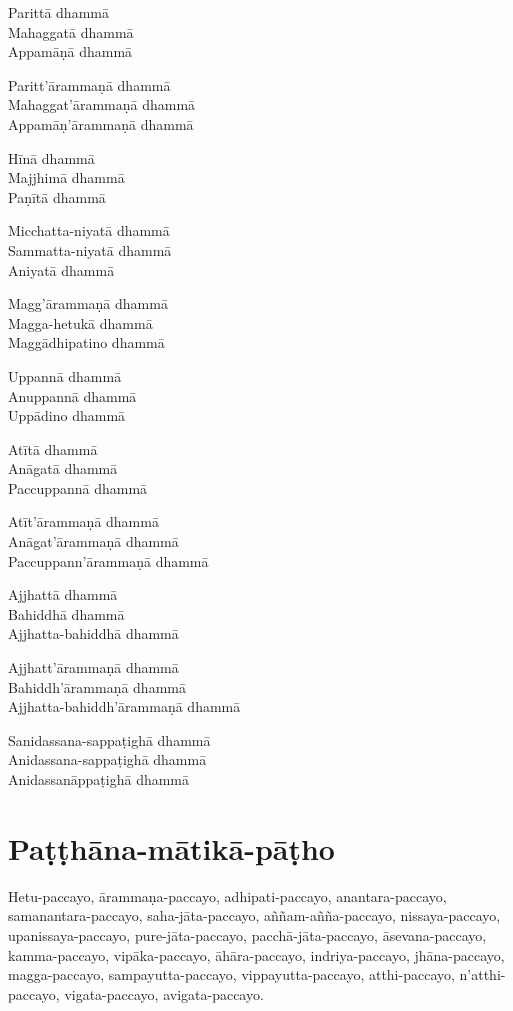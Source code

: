 \begin{paritta}
Parittā dhammā\\
Mahaggatā dhammā\\
Appamāṇā dhammā

Paritt'ārammaṇā dhammā\\
Mahaggat'ārammaṇā dhammā\\
Appamāṇ'ārammaṇā dhammā

Hīnā dhammā\\
Majjhimā dhammā\\
Paṇītā dhammā

Micchatta-niyatā dhammā\\
Sammatta-niyatā dhammā\\
Aniyatā dhammā

Magg'ārammaṇā dhammā\\
Magga-hetukā dhammā\\
Maggādhipatino dhammā

\clearpage

Uppannā dhammā\\
Anuppannā dhammā\\
Uppādino dhammā

Atītā dhammā\\
Anāgatā dhammā\\
Paccuppannā dhammā

Atīt'ārammaṇā dhammā\\
Anāgat'ārammaṇā dhammā\\
Paccuppann'ārammaṇā dhammā

Ajjhattā dhammā\\
Bahiddhā dhammā\\
Ajjhatta-bahiddhā dhammā

Ajjhatt'ārammaṇā dhammā\\
Bahiddh'ārammaṇā dhammā\\
Ajjhatta-bahiddh'ārammaṇā dhammā

Sanidassana-sappaṭighā dhammā\\
Anidassana-sappaṭighā dhammā\\
Anidassanāppaṭighā dhammā
\end{paritta}

\chapter{Paṭṭhāna-mātikā-pāṭho}


\begin{paritta}
Hetu-paccayo, ārammaṇa-paccayo, adhipati-paccayo, anantara-paccayo,
samanantara-paccayo, saha-jāta-paccayo, aññam-añña-paccayo,
nissaya-paccayo, upanissaya-paccayo, pure-jāta-paccayo,
pacchā-jāta-paccayo, āsevana-paccayo, kamma-paccayo, vipāka-paccayo,
āhāra-paccayo, indriya-paccayo, jhāna-paccayo, magga-paccayo,
sampayutta-paccayo, vippayutta-paccayo, atthi-paccayo, n'atthi-paccayo,
vigata-paccayo, avigata-paccayo.
\end{paritta}

